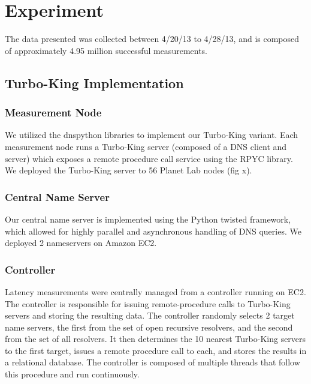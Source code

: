 
\section{Experiment}
\label{sec:experiment}

The data presented was collected between 4/20/13 to 4/28/13, and is composed of approximately 4.95 million successful measurements.

\subsection{Turbo-King Implementation}
\label{sec:turbo-king}

\subsubsection{Measurement Node}
We utilized the dnspython libraries to implement our Turbo-King variant. Each measurement node runs a Turbo-King server (composed of a DNS client and server) which exposes a remote procedure call service using the RPYC library. We deployed the Turbo-King server to 56 Planet Lab nodes (fig x).

\subsubsection{Central Name Server}
Our central name server is implemented using the Python twisted framework, which allowed for highly parallel and asynchronous handling of DNS queries. We deployed 2 nameservers on Amazon EC2.

\subsubsection{Controller}
Latency measurements were centrally managed from a controller running on EC2. The controller is responsible for issuing remote-procedure calls to Turbo-King servers and storing the resulting data. The controller randomly selects 2 target name servers, the first from the set of open recursive resolvers, and the second from the set of all resolvers. It then determines the 10 nearest Turbo-King servers to the first target, issues a remote procedure call to each, and stores the results in a relational database. The controller is composed of multiple threads that follow this procedure and run continuously.

